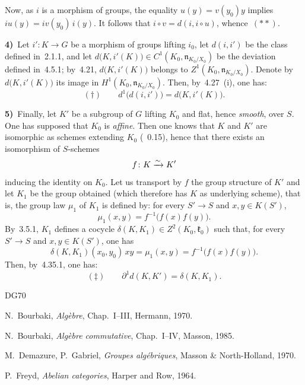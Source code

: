 Now, as \(i\) is a morphism of groups, the equality \(u(y)=v(y_0)y\)
implies \(iu(y)=iv(y_0)\,i(y)\). It follows that
\(i\circ v=d(i,i\circ u)\), whence~\((**)\).

\noindent\textbf{4)}\
Let \(i'\colon K\to G\) be a morphism of groups lifting \(i_0\), let
\(d(i,i')\) be the class defined in~2.1.1, and let
\(d\bigl(K,i'(K)\bigr)\in C^{1}(K_0,\mathfrak{n}_{K_0/X_0})\) be the
deviation defined in~4.5.1; by~4.21, \(d\bigl(K,i'(K)\bigr)\) belongs to
\(Z^{1}(K_0,\mathfrak{n}_{K_0/X_0})\). Denote by \(d\bigl(K,i'(K)\bigr)\)
its image in \(H^{1}(K_0,\mathfrak{n}_{K_0/X_0})\). Then, by~4.27~(i), one
has:
\[
(\dagger)\qquad
d^{1}\bigl(d(i,i')\bigr)=d\bigl(K,i'(K)\bigr).
\]

\noindent\textbf{5)}\
Finally, let \(K'\) be a subgroup of \(G\) lifting \(K_0\) and flat, hence
\emph{smooth}, over \(S\). One has supposed that \(K_0\) is \emph{affine}.
Then one knows that \(K\) and \(K'\) are isomorphic as schemes extending
\(K_0\) (\cf~0.15), hence that there exists an isomorphism of \(S\)-schemes
\[
f\colon K\xrightarrow{\sim} K'
\]
inducing the identity on \(K_0\). Let us transport by \(f\) the group
structure of \(K'\) and let \(K_1\) be the group obtained (which therefore
has \(K\) as underlying scheme), that is, the group law \(\mu_1\) of
\(K_1\) is defined by: for every \(S'\to S\) and \(x,y\in K(S')\),
\[
\mu_1(x,y)=f^{-1}\bigl(f(x)f(y)\bigr).
\]
{\renewcommand{\thefootnote}{(142)}}
By~3.5.1, \(K_1\) defines a cocycle
\(\delta(K,K_1)\in Z^{2}(K_0,\mathfrak{k}_0)\) such that, for every
\(S'\to S\) and \(x,y\in K(S')\), one has
\[
\delta(K,K_1)(x_0,y_0)\,xy=\mu_1(x,y)=f^{-1}\bigl(f(x)f(y)\bigr).
\]
Then, by~4.35.1, one has:
\[
(\ddagger)\qquad
\partial^{1}d(K,K')=\delta(K,K_1).
\]

\makeatletter
\renewcommand{\@bibtitlestyle}{%
  \par\addvspace{1.1\baselineskip}%
  \noindent{\large\bfseries Bibliography}%
  {\renewcommand{\thefootnote}{(143)}\nde{: additional references cited in this Exposé.}}%
  \par\addvspace{0.45\baselineskip}%
}
\makeatother
\begin{thebibliography}{DG70}

N.~Bourbaki, \emph{Algèbre}, Chap.~I--III, Hermann, 1970.

N.~Bourbaki, \emph{Algèbre commutative}, Chap.~I--IV, Masson, 1985.

\bibitem[DG70]{DG70}
M.~Demazure, P.~Gabriel, \emph{Groupes algébriques}, Masson \&
North-Holland, 1970.

P.~Freyd, \emph{Abelian categories}, Harper and Row, 1964.

\end{thebibliography}
